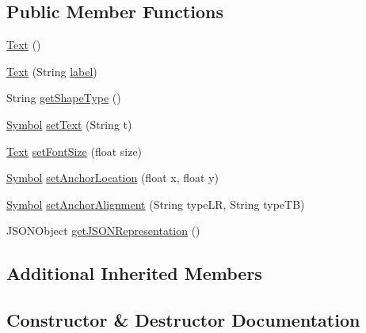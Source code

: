 \subsection*{Public Member Functions}
\begin{DoxyCompactItemize}
\item 
\hyperlink{classbridges_1_1base_1_1_text_abed5c0fd8971ab58f1963e5d4bca8482}{Text} ()
\item 
\hyperlink{classbridges_1_1base_1_1_text_a1df275662a047535686286e025034217}{Text} (String \hyperlink{classbridges_1_1base_1_1_symbol_ad2adcc82e6a96c2f3c465702502655e9}{label})
\item 
String \hyperlink{classbridges_1_1base_1_1_text_ac4ddf14ec9b6265da4eceaaf5ec42f85}{get\+Shape\+Type} ()
\item 
\hyperlink{classbridges_1_1base_1_1_symbol}{Symbol} \hyperlink{classbridges_1_1base_1_1_text_a57e1d8586ce57eeed2eac1c92d9fbc7c}{set\+Text} (String t)
\item 
\hyperlink{classbridges_1_1base_1_1_text}{Text} \hyperlink{classbridges_1_1base_1_1_text_a151f12946439cfdab49e4aaf791f3c32}{set\+Font\+Size} (float size)
\item 
\hyperlink{classbridges_1_1base_1_1_symbol}{Symbol} \hyperlink{classbridges_1_1base_1_1_text_ad878ddc8b965f77ed279019822ba7ba1}{set\+Anchor\+Location} (float x, float y)
\item 
\hyperlink{classbridges_1_1base_1_1_symbol}{Symbol} \hyperlink{classbridges_1_1base_1_1_text_a26aea94a119885a8127bac8345a9fe52}{set\+Anchor\+Alignment} (String type\+LR, String type\+TB)
\item 
J\+S\+O\+N\+Object \hyperlink{classbridges_1_1base_1_1_text_a463507cf8a25a600a213ca0ff849a568}{get\+J\+S\+O\+N\+Representation} ()
\end{DoxyCompactItemize}
\subsection*{Additional Inherited Members}


\subsection{Constructor \& Destructor Documentation}
\mbox{\label{classbridges_1_1base_1_1_text_abed5c0fd8971ab58f1963e5d4bca8482}} 
